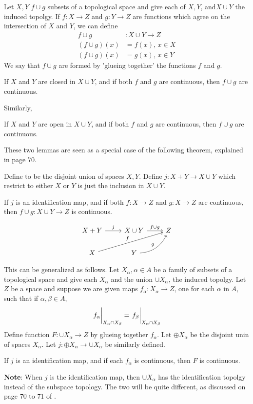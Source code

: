 \begin{defi}[$f\cup g$]
    Let $X,Y$ $f\cup g$ subsets of a topological space and give each of
    $X,Y$, and$X\cup Y$ the induced topolgy. If $f:X\to Z$ and
    $g:Y\to Z$ are functions which agree on the intersection of $X$
    and $Y$, we can define
    \begin{align}
        f\cup g &: X\cup Y \to Z  \\
        (f\cup g)(x) &= f(x),\, x\in X \nonumber \\
        (f\cup g)(x) &= g(x),\, x\in Y \nonumber
    \end{align}
    We say that $f\cup g$ are formed by 'glueing together' the
    functions $f$ and $g$.
\end{defi}
\begin{lemma}
    If $X$ and $Y$ are closed in $X\cup Y$, and if both $f$ and $g$
    are continuous, then $f\cup g$ are continuous.
\end{lemma}
Similarly, 
\begin{lemma}
    If $X$ and $Y$ are open in $X\cup Y$, and if both $f$ and $g$
    are continuous, then $f\cup g$ are continuous.
\end{lemma}

These two lemmas are seen as a special case of the following theorem,
explained in page 70.

Define  to be the disjoint union of spaces $X,Y$. Define
$j:X+Y \to X\cup Y$ which restrict to either $X$ or $Y$ is just the
inclusion in $X\cup Y$.
\begin{thm}
    If $j$ is an identification map, and if both $f:X\to Z$ and
    $g:X\to Z$ are continuous, then $f\cup g:X\cup Y\to Z$ is
    continuous.
\end{thm}
$$ \begin{tikzcd}[]
    X+Y \ar[r,"j"] & X\cup Y\ar[r,"f\cup g"] & Z \\
    X\ar[rru,"f"] & Y\ar[ru,"g",bend right]
\end{tikzcd}$$

This can be generalized as follows. Let $X_\alpha,\alpha\in A$ be a
family of subsets of a topological space and give each $X_\alpha$ and
the union $\cup X_\alpha$, the induced topolgy. Let $Z$ be a space and
suppose we are given maps $f_\alpha:X_\alpha\to Z$, one for each
$\alpha$ in $A$, such that if $\alpha,\beta\in A$,
$$ 
\eval{f_\alpha}_{X_\alpha\cap X_\beta} = \eval{f_\beta}_{X_\alpha\cap X_\beta}
$$
Define function $F:\cup X_\alpha\to Z$ by glueing together $f_\alpha$.
Let $\oplus X_\alpha$ be the disjoint unin of spaces $X_\alpha$. Let
$j:\oplus X_\alpha \to \cup X_\alpha$ be similarly defined.
\begin{thm}
    If $j$ is an identification map, and if each $f_\alpha$
    is continuous, then $F$ is continuous.
\end{thm}
\textbf{Note}: When $j$ is the identification map, then $\cup
X_\alpha$ has the identification topolgy instead of the subspace
topology. The two will be quite different, as discussed on page 70 to
71 of \cite{book}.


